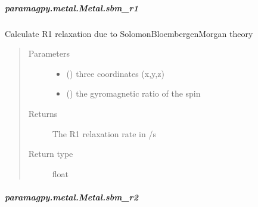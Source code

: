 \documentclass[a4paper,10pt,english,openany,oneside]{sphinxmanual}
\begin{document}
\begin{fulllineitems}
\begin{fulllineitems}
\subparagraph{paramagpy.metal.Metal.sbm\_r1}
\label{\detokenize{reference/generated/paramagpy.metal.Metal.sbm_r1:paramagpy-metal-metal-sbm-r1}}\label{\detokenize{reference/generated/paramagpy.metal.Metal.sbm_r1::doc}}

\begin{fulllineitems}
\label{\detokenize{reference/generated/paramagpy.metal.Metal.sbm_r1:paramagpy.metal.Metal.sbm_r1}}
\sphinxAtStartPar
Calculate R1 relaxation due to Solomon\sphinxhyphen{}Bloembergen\sphinxhyphen{}Morgan theory
\begin{quote}\begin{description}
\item[{Parameters}] \leavevmode\begin{itemize}
\item {} 
\sphinxAtStartPar
{} () \textendash{} three coordinates (x,y,z)

\item {} 
\sphinxAtStartPar
{} () \textendash{} the gyromagnetic ratio of the spin

\end{itemize}

\item[{Returns}] \leavevmode
\sphinxAtStartPar
{} \textendash{} The R1 relaxation rate in /s

\item[{Return type}] \leavevmode
\sphinxAtStartPar
float

\end{description}\end{quote}

\end{fulllineitems}



\subparagraph{paramagpy.metal.Metal.sbm\_r2}
\label{\detokenize{reference/generated/paramagpy.metal.Metal.sbm_r2:paramagpy-metal-metal-sbm-r2}}\label{\detokenize{reference/generated/paramagpy.metal.Metal.sbm_r2::doc}}


\end{fulllineitems}
\end{fulllineitems}
\end{document}
